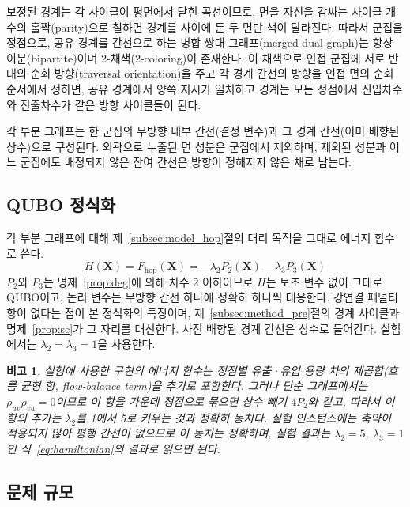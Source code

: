 \documentclass[twocolumn,a4paper]{article}
\newtheorem{remark}{비고}
\begin{document}
보정된 경계는 각 사이클이 평면에서 닫힌 곡선이므로, 면을 자신을 감싸는 사이클 개수의 홀짝(parity)으로 칠하면 경계를 사이에 둔 두 면만 색이 달라진다. 따라서 군집을 정점으로, 공유 경계를 간선으로 하는 병합 쌍대 그래프(merged dual graph)는 항상 이분(bipartite)이며 2-채색(2-coloring)이 존재한다. 이 채색으로 인접 군집에 서로 반대의 순회 방향(traversal orientation)을 주고 각 경계 간선의 방향을 인접 면의 순회 순서에서 정하면, 공유 경계에서 양쪽 지시가 일치하고 경계는 모든 정점에서 진입차수와 진출차수가 같은 방향 사이클들이 된다.

각 부분 그래프는 한 군집의 무방향 내부 간선(결정 변수)과 그 경계 간선(이미 배향된 상수)으로 구성된다. 외곽으로 누출된 면 성분은 군집에서 제외하며, 제외된 성분과 어느 군집에도 배정되지 않은 잔여 간선은 방향이 정해지지 않은 채로 남는다.

\subsection{QUBO 정식화} \label{subsec:method_qubo}

각 부분 그래프에 대해 제~\ref{subsec:model_hop}절의 대리 목적을 그대로 에너지 함수로 쓴다.
\begin{equation}
    H(\mathbf{X})=F_{\mathrm{hop}}(\mathbf{X})=-\lambda_2P_2(\mathbf{X})-\lambda_3P_3(\mathbf{X})
\label{eq:hamiltonian}
\end{equation}
\(P_2\)와 \(P_3\)는 명제~\ref{prop:deg}에 의해 차수 2 이하이므로 \(H\)는 보조 변수 없이 그대로 QUBO이고, 논리 변수는 무방향 간선 하나에 정확히 하나씩 대응한다. 강연결 페널티 항이 없다는 점이 본 정식화의 특징이며, 제~\ref{subsec:method_pre}절의 경계 사이클과 명제~\ref{prop:sc}가 그 자리를 대신한다. 사전 배향된 경계 간선은 상수로 들어간다. 실험에서는 \(\lambda_2=\lambda_3=1\)을 사용한다.

\begin{remark} \label{rmk:flow}
실험에 사용한 구현의 에너지 함수는 정점별 유출·유입 용량 차의 제곱합(흐름 균형 항, flow-balance term)을 추가로 포함한다. 그러나 단순 그래프에서는 \(\rho_{uv}\rho_{vu}=0\)이므로 이 항을 가운데 정점으로 묶으면 상수 빼기 \(4P_2\)와 같고, 따라서 이 항의 추가는 \(\lambda_2\)를 1에서 5로 키우는 것과 정확히 동치다. 실험 인스턴스에는 축약이 적용되지 않아 평행 간선이 없으므로 이 동치는 정확하며, 실험 결과는 \(\lambda_2=5\), \(\lambda_3=1\)인 식~\eqref{eq:hamiltonian}의 결과로 읽으면 된다.
\end{remark}

\subsection{문제 규모} \label{subsec:method_partition}
\end{document}
